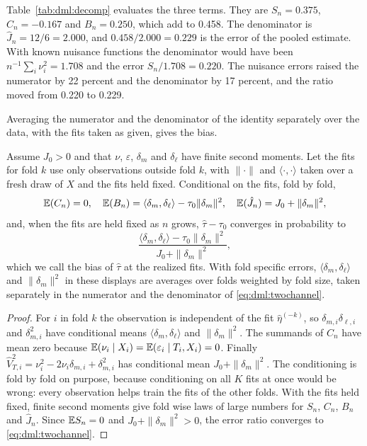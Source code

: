 Table~\ref{tab:dml:decomp} evaluates the three terms. They are $S_n = 0.375$, $C_n = -0.167$ and $B_n = 0.250$, which add to 0.458. The denominator is $\hat J_n = 12/6 = 2.000$, and $0.458/2.000 = 0.229$ is the error of the pooled estimate. With known nuisance functions the denominator would have been $n^{-1}\sum_i\nu_i^2 = 1.708$ and the error $S_n/1.708 = 0.220$. The nuisance errors raised the numerator by 22 percent and the denominator by 17 percent, and the ratio moved from 0.220 to 0.229.

Averaging the numerator and the denominator of the identity separately over the data, with the fits taken as given, gives the bias.

\begin{corollary}\label{dml:cor:channels}
Assume $J_0 > 0$ and that $\nu$, $\varepsilon$, $\delta_m$ and $\delta_\ell$ have finite second moments. Let the fits for fold $k$ use only observations outside fold $k$, with $\|\cdot\|$ and $\langle\cdot,\cdot\rangle$ taken over a fresh draw of $X$ and the fits held fixed. Conditional on the fits, fold by fold,
\[
\mathbb{E}(C_n) = 0, \quad \mathbb{E}(B_n) = \langle\delta_m, \delta_\ell\rangle - \tau_0\|\delta_m\|^2, \quad \mathbb{E}(\hat J_n) = J_0 + \|\delta_m\|^2,
\]
and, when the fits are held fixed as $n$ grows, $\hat\tau - \tau_0$ converges in probability to
\begin{equation}
\frac{\langle\delta_m, \delta_\ell\rangle - \tau_0\|\delta_m\|^2}{J_0 + \|\delta_m\|^2},
\label{eq:dml:twochannel}
\end{equation}
which we call the bias of $\hat\tau$ at the realized fits. With fold specific errors, $\langle\delta_m, \delta_\ell\rangle$ and $\|\delta_m\|^2$ in these displays are averages over folds weighted by fold size, taken separately in the numerator and the denominator of \eqref{eq:dml:twochannel}.
\end{corollary}

\begin{proof}
For $i$ in fold $k$ the observation is independent of the fit $\hat\eta^{(-k)}$, so $\delta_{m,i}\delta_{\ell,i}$ and $\delta_{m,i}^2$ have conditional means $\langle\delta_m, \delta_\ell\rangle$ and $\|\delta_m\|^2$. The summands of $C_n$ have mean zero because $\mathbb{E}(\nu_i \mid X_i) = \mathbb{E}(\varepsilon_i \mid T_i, X_i) = 0$. Finally $\hat V_{T,i}^2 = \nu_i^2 - 2\nu_i\delta_{m,i} + \delta_{m,i}^2$ has conditional mean $J_0 + \|\delta_m\|^2$. The conditioning is fold by fold on purpose, because conditioning on all $K$ fits at once would be wrong: every observation helps train the fits of the other folds. With the fits held fixed, finite second moments give fold wise laws of large numbers for $S_n$, $C_n$, $B_n$ and $\hat J_n$. Since $\mathbb{E} S_n = 0$ and $J_0 + \|\delta_m\|^2 > 0$, the error ratio converges to \eqref{eq:dml:twochannel}.
\end{proof}

